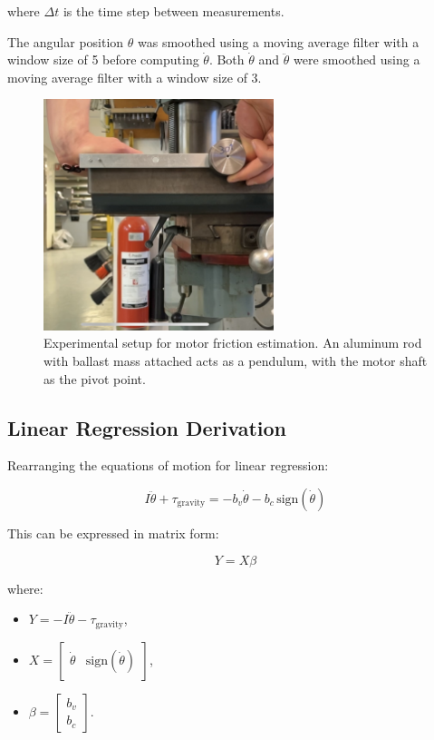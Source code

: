 where \(\Delta t\) is the time step between measurements.

The angular position \(\theta\) was smoothed using a moving average filter with a window size of 5 before computing \(\dot{\theta}\). Both \(\dot{\theta}\) and \(\ddot{\theta}\) were smoothed using a moving average filter with a window size of 3.

\begin{figure}[h]
    \centering
    \includegraphics[width=0.6\textwidth]{Images/friction_estimation/big_motor.jpg}
    \caption{Experimental setup for motor friction estimation. An aluminum rod with ballast mass attached acts as a pendulum, with the motor shaft as the pivot point.}
    \label{fig:results:motor_friction_estimation:pendulum_setup}
\end{figure}

\subsection{Linear Regression Derivation}
Rearranging the equations of motion for linear regression:

\[
I \ddot{\theta} + \tau_{\text{gravity}} = -b_v \dot{\theta} - b_c \, \text{sign}(\dot{\theta})
\]

This can be expressed in matrix form:

\[
Y = X \beta
\]

where:
\begin{itemize}
    \item \( Y = -I \ddot{\theta} - \tau_{\text{gravity}} \),
    \item \( X = \begin{bmatrix} \dot{\theta} & \text{sign}(\dot{\theta}) \end{bmatrix} \),
    \item \( \beta = \begin{bmatrix} b_v \\ b_c \end{bmatrix} \).
\end{itemize}

